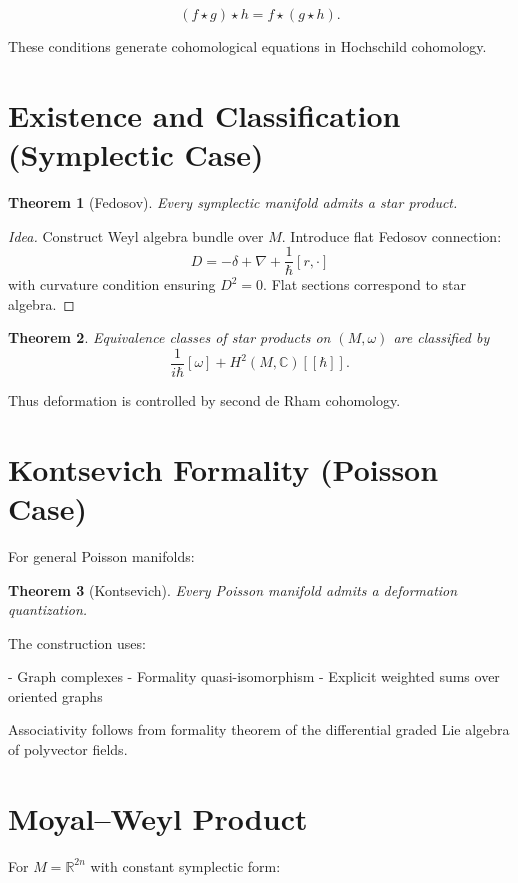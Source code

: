 \documentclass[11pt]{book}
\newtheorem{theorem}{Theorem}[chapter]
\begin{document}
\[
(f \star g) \star h = f \star (g \star h).
\]

These conditions generate cohomological equations in Hochschild cohomology.

\section{Existence and Classification (Symplectic Case)}

\begin{theorem}[Fedosov]
Every symplectic manifold admits a star product.
\end{theorem}

\begin{proof}[Idea]
Construct Weyl algebra bundle over $M$.
Introduce flat Fedosov connection:
\[
D = -\delta + \nabla + \frac{1}{\hbar}[r,\cdot]
\]
with curvature condition ensuring $D^2=0$.
Flat sections correspond to star algebra.
\end{proof}

\begin{theorem}
Equivalence classes of star products on $(M,\omega)$ are classified by
\[
\frac{1}{i\hbar}[\omega] + H^2(M,\mathbb{C})[[\hbar]].
\]
\end{theorem}

Thus deformation is controlled by second de Rham cohomology.

\section{Kontsevich Formality (Poisson Case)}

For general Poisson manifolds:

\begin{theorem}[Kontsevich]
Every Poisson manifold admits a deformation quantization.
\end{theorem}

The construction uses:

- Graph complexes
- Formality quasi-isomorphism
- Explicit weighted sums over oriented graphs

Associativity follows from formality theorem of the differential graded Lie algebra of polyvector fields.

\section{Moyal--Weyl Product}

For $M = \mathbb{R}^{2n}$ with constant symplectic form:
\end{document}
